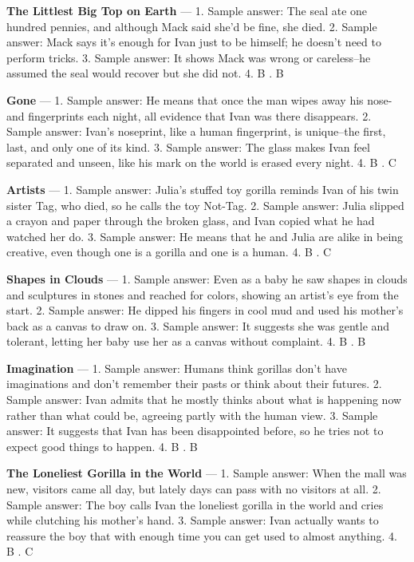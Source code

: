 \documentclass[11pt]{article}
\begin{document}
\noindent\textbf{The Littlest Big Top on Earth} --- 1. Sample answer: The seal ate one hundred pennies, and although Mack said she'd be fine, she died. 2. Sample answer: Mack says it's enough for Ivan just to be himself; he doesn't need to perform tricks. 3. Sample answer: It shows Mack was wrong or careless--he assumed the seal would recover but she did not. 4. B . B

\noindent\textbf{Gone} --- 1. Sample answer: He means that once the man wipes away his nose- and fingerprints each night, all evidence that Ivan was there disappears. 2. Sample answer: Ivan's noseprint, like a human fingerprint, is unique--the first, last, and only one of its kind. 3. Sample answer: The glass makes Ivan feel separated and unseen, like his mark on the world is erased every night. 4. B . C

\noindent\textbf{Artists} --- 1. Sample answer: Julia's stuffed toy gorilla reminds Ivan of his twin sister Tag, who died, so he calls the toy Not-Tag. 2. Sample answer: Julia slipped a crayon and paper through the broken glass, and Ivan copied what he had watched her do. 3. Sample answer: He means that he and Julia are alike in being creative, even though one is a gorilla and one is a human. 4. B . C

\noindent\textbf{Shapes in Clouds} --- 1. Sample answer: Even as a baby he saw shapes in clouds and sculptures in stones and reached for colors, showing an artist's eye from the start. 2. Sample answer: He dipped his fingers in cool mud and used his mother's back as a canvas to draw on. 3. Sample answer: It suggests she was gentle and tolerant, letting her baby use her as a canvas without complaint. 4. B . B

\noindent\textbf{Imagination} --- 1. Sample answer: Humans think gorillas don't have imaginations and don't remember their pasts or think about their futures. 2. Sample answer: Ivan admits that he mostly thinks about what is happening now rather than what could be, agreeing partly with the human view. 3. Sample answer: It suggests that Ivan has been disappointed before, so he tries not to expect good things to happen. 4. B . B

\noindent\textbf{The Loneliest Gorilla in the World} --- 1. Sample answer: When the mall was new, visitors came all day, but lately days can pass with no visitors at all. 2. Sample answer: The boy calls Ivan the loneliest gorilla in the world and cries while clutching his mother's hand. 3. Sample answer: Ivan actually wants to reassure the boy that with enough time you can get used to almost anything. 4. B . C
\end{document}
